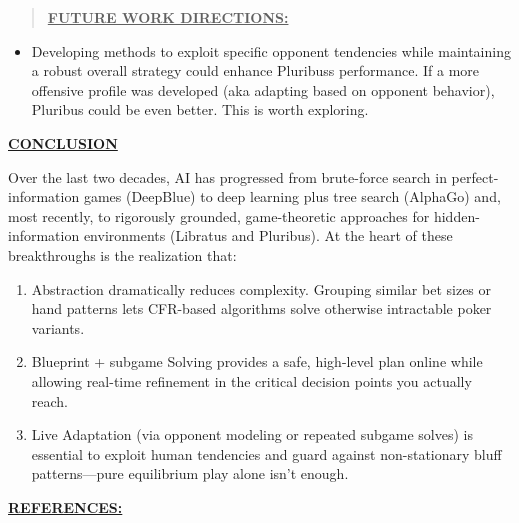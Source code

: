 \documentclass[
]{article}
\begin{document}
\begin{quote}
\textbf{\ul{FUTURE WORK DIRECTIONS:}}
\end{quote}

\begin{itemize}
\item
  Developing methods to exploit specific opponent tendencies while
  maintaining a robust overall strategy could enhance
  Pluribus\textquotesingle s performance. If a more offensive profile
  was developed (aka adapting based on opponent behavior), Pluribus
  could be even better. This is worth exploring.
\end{itemize}

\textbf{\ul{CONCLUSION}}

Over the last two decades, AI has progressed from brute-force search in
perfect-information games (DeepBlue) to deep learning plus tree search
(AlphaGo) and, most recently, to rigorously grounded, game-theoretic
approaches for hidden-information environments (Libratus and Pluribus).
At the heart of these breakthroughs is the realization that:

\begin{enumerate}
\def\labelenumi{\arabic{enumi}.}
\item
  Abstraction dramatically reduces complexity. Grouping similar bet
  sizes or hand patterns lets CFR-based algorithms solve otherwise
  intractable poker variants.
\item
  Blueprint + subgame Solving provides a safe, high-level plan online
  while allowing real-time refinement in the critical decision points
  you actually reach.
\item
  Live Adaptation (via opponent modeling or repeated subgame solves) is
  essential to exploit human tendencies and guard against non-stationary
  bluff patterns---pure equilibrium play alone isn't enough.
\end{enumerate}

\textbf{\ul{REFERENCES:}}
\end{document}
